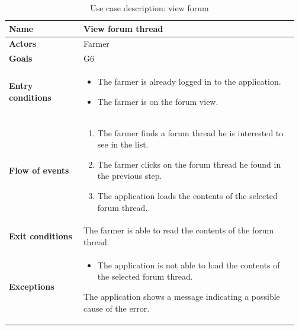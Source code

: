 \begin{table}[H]
    \centering
	\begin{tabular}{@{}p{0.25\linewidth} p{0.72\linewidth}@{}}
        \toprule
		\textbf{Name}               & View forum thread\\
		\midrule
		\textbf{Actors}             & Farmer\\
		\midrule
		\textbf{Goals}              & G6 \\
		\midrule
		
		\textbf{Entry conditions}   & \begin{itemize}[leftmargin=.4cm,noitemsep,topsep=0pt,before=\vspace{-3mm},after=\vspace{-4mm}]
		    \item The farmer is already logged in to the application.
		    \item The farmer is on the forum view.
		\end{itemize}\\
		\midrule
		
		\textbf{Flow of events}     & \begin{enumerate}[leftmargin=.4cm,noitemsep,topsep=0pt,before=\vspace{-3mm},after=\vspace{-4mm}]
		    \item The farmer finds a forum thread he is interested to see in the list.
		    \item The farmer clicks on the forum thread he found in the previous step.
		    \item The application loads the contents of the selected forum thread.
		\end{enumerate}\\
		\midrule
		\textbf{Exit conditions}    &  The farmer is able to read the contents of the forum thread. \\
		\midrule
		
		\textbf{Exceptions}         & 
	    \begin{itemize}[leftmargin=.4cm,noitemsep,topsep=0pt,before=\vspace{-3mm}]
		   \item The application is not able to load the contents of the selected forum thread.
		\end{itemize}
		The application shows a message indicating a possible cause of the error.
		\\\bottomrule
	\end{tabular}
	\caption{Use case description: view forum} 
\end{table}

